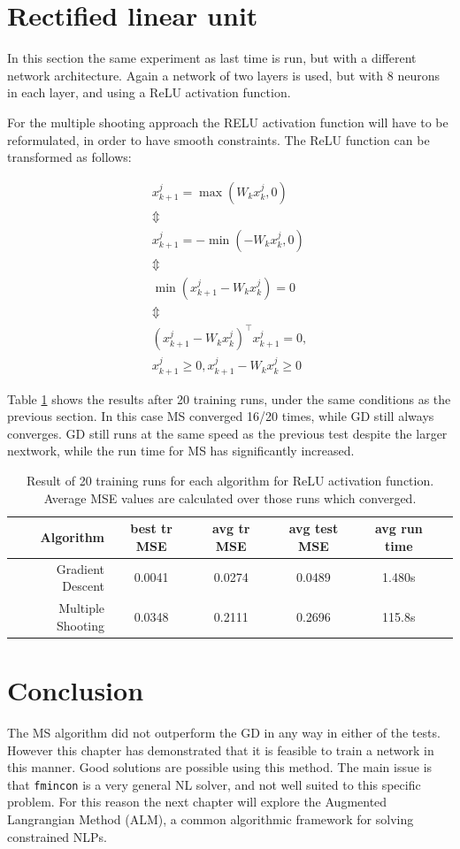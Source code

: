 \section{Rectified linear unit}
In this section the same experiment as last time is run, but with a different network architecture. Again a network of two layers is used, but with 8 neurons in each layer, and using a ReLU activation function. 

For the multiple shooting approach the RELU activation function will have to be reformulated, in order to have smooth constraints. The ReLU function can be transformed as follows:

\begin{gather*}
   x_{k+1}^j = \max(W_kx_k^j,0) \\
   \Updownarrow \\
   x_{k+1}^j = -\min(-W_kx_k^j,0) \\
   \Updownarrow \\
   \min(x_{k+1}^j-W_kx_k^j) = 0 \\
   \Updownarrow \\
   (x_{k+1}^j-W_kx_k^j)^\top x_{k+1}^j = 0,\\
   x_{k+1}^j\geq 0,x_{k+1}^j-W_kx_k^j\geq 0
\end{gather*}


Table \ref{tab:relu} shows the results after 20 training runs, under the same conditions as the previous section. In this case MS converged 16/20 times, while GD still always converges. GD still runs at the same speed as the previous test despite the larger nextwork, while the run time for MS has significantly increased. 
   
   
\begin{table}
	\centering
	\begin{tabular}{r | c c c c c}
		Algorithm & \small best tr MSE & \small avg tr MSE & \small avg test MSE & \small avg run time \\ \hline
		Gradient Descent & 0.0041 & 0.0274 & 0.0489 & 1.480s \\
		Multiple Shooting & 0.0348 & 0.2111 & 0.2696 & 115.8s \\
	\end{tabular}
	\caption{Result of 20 training runs for each algorithm for ReLU activation function. Average MSE values are calculated over those runs which converged.}
	\label{tab:relu}
\end{table}


\section{Conclusion}
The MS algorithm did not outperform the GD in any way in either of the tests. However this chapter has demonstrated that it is feasible to train a network in this manner. Good solutions are possible using this method. The main issue is that \texttt{fmincon} is a very general NL solver, and not well suited to this specific problem. For this reason the next chapter will explore the Augmented Langrangian Method (ALM), a common algorithmic framework for solving constrained NLPs.





